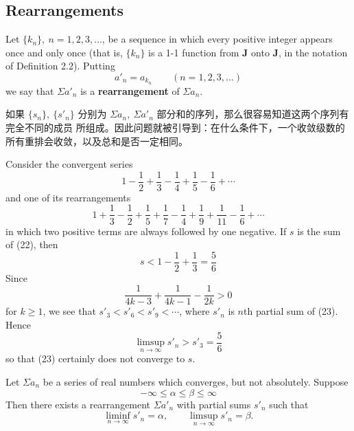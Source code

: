 \documentclass[../poma-notes.tex]{subfiles}
\begin{document}
\subsection*{Rearrangements}

\begin{definition}
  Let $\{k_n\},\ n=1,2,3,\dots$, be a sequence in which every positive integer appears once and only once
  (that is, $\{k_n\}$ is a 1-1 function from $\pmb{J}$ onto $\pmb{J}$, in the notation of Definition 2.2).
  Putting
  \[
    a'_n = a_{k_n} \qquad (n=1,2,3,\dots)
  \]
  we say that $\Sigma a'_n$ is a \textbf{rearrangement} of $\Sigma a_n$.
\end{definition}

如果 $\{s_n\},\ \{s'_n\}$ 分别为 $\Sigma a_n,\ \Sigma a'_n$ 部分和的序列，那么很容易知道这两个序列有完全不同的成员
所组成。因此问题就被引导到：在什么条件下，一个收敛级数的所有重排会收敛，以及总和是否一定相同。

\begin{example}
  Consider the convergent series
  \begin{equation}
    1 - \frac{1}{2} + \frac{1}{3} - \frac{1}{4} + \frac{1}{5} - \frac{1}{6} + \cdots
  \end{equation}
  and one of its rearrangements
  \begin{equation}
    1 + \frac{1}{3} - \frac{1}{2} + \frac{1}{5} + \frac{1}{7} - \frac{1}{4} + \frac{1}{9} + \frac{1}{11} -
    \frac{1}{6} + \cdots
  \end{equation}
  in which two positive terms are always followed by one negative. If $s$ is the sum of (22), then
  \[
    s < 1 - \frac{1}{2} + \frac{1}{3} = \frac{5}{6}
  \]
  Since
  \[
    \frac{1}{4k - 3} + \frac{1}{4k - 1} - \frac{1}{2k} > 0
  \]
  for $k \ge 1$, we see that $s'_3 < s'_6 < s'_9 < \cdots$, where $s'_n$ is $n$th partial sum of (23).
  Hence
  \[
    \limsup_{n\to\infty} s'_n > s'_3 = \frac{5}{6}
  \]
  so that (23) certainly does not converge to $s$.
\end{example}

\begin{theorem}
  Let $\Sigma a_n$ be a series of real numbers which converges, but not absolutely. Suppose
  \[
    -\infty \le \alpha \le \beta \le \infty
  \]
  Then there exists a rearrangement $\Sigma a'_n$ with partial sums $s'_n$ such that
  \begin{equation}
    \liminf_{n\to\infty} s'_n = \alpha, \qquad \limsup_{n\to\infty} s'_n = \beta.
  \end{equation}
\end{theorem}
\end{document}
